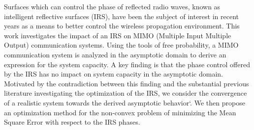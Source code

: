 Surfaces which can control the phase of reflected radio waves, known as intelligent reflective surfaces (IRS), have been the subject of interest in recent years as a means to better control the wireless propagation environment. This work investigates the impact of an IRS on MIMO (Multiple Input Multiple Output)  communication systems. Using the tools of free probability, a MIMO communication system is analyzed in the asymptotic domain to derive an expression for the system capacity. A key finding is that the phase control offered by the IRS has no impact on system capacity in the asymptotic domain. Motivated by the contradiction between this finding and the substantial previous literature investigating the optimization of the IRS, we consider the convergence of a realistic system towards the derived asymptotic behavior`. We then propose an optimization method for the non-convex problem of minimizing the Mean Square Error with respect to the IRS phases.